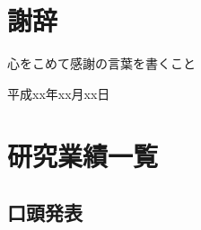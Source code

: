 \chapter{謝辞}
\begin{spacing}{2.0}
心をこめて感謝の言葉を書くこと
\end{spacing}
平成xx年xx月xx日




%


\chapter{研究業績一覧}

\section*{口頭発表}

\begin{業績}
 \item 
 \item 
\end{業績}




